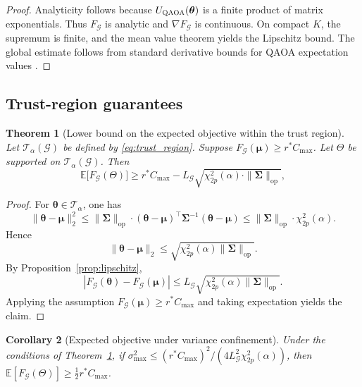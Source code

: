 \documentclass[aps,prx,reprint,superscriptaddress,longbibliography]{revtex4-2}
\newcommand{\QAOA}{\textnormal{\textsc{QAOA}}}
\newcommand{\calG}{\mathcal{G}}
\newcommand{\calT}{\mathcal{T}}
\newcommand{\bbE}{\mathbb{E}}
\newtheorem{theorem}{Theorem}
\newtheorem{corollary}[theorem]{Corollary}
\begin{document}
\begin{proof}
Analyticity follows because $U_{\QAOA}(\bm\theta)$ is a finite product
of matrix exponentials. Thus $F_\calG$ is analytic and $\nabla F_\calG$
is continuous. On compact $K$, the supremum is finite, and the mean
value theorem yields the Lipschitz bound. The global estimate follows
from standard derivative bounds for \QAOA{} expectation values
\cite{cerezo2021,schuld2019}.
\end{proof}

\subsection{Trust-region guarantees}

\begin{theorem}[Lower bound on the expected objective within the trust region]
\label{thm:landscape_lb}
Let $\calT_\alpha(\calG)$ be defined by \cref{eq:trust_region}. Suppose
$F_\calG(\bm\mu) \ge r^* C_{\max}$. Let $\Theta$ be supported on
$\calT_\alpha(\calG)$. Then
\begin{equation}
    \bbE\bigl[F_\calG(\Theta)\bigr]
    \ge r^* C_{\max}
    - L_\calG \sqrt{\chi^2_{2p}(\alpha)\cdot
    \|\bm\Sigma\|_{\mathrm{op}}},
    \label{eq:landscape_lb}
\end{equation}
\end{theorem}
\begin{proof}
For $\bm\theta \in \calT_\alpha$, one has
\begin{equation*}
    \|\bm\theta - \bm\mu\|_2^2
    \le \|\bm\Sigma\|_{\mathrm{op}}\cdot
    (\bm\theta - \bm\mu)^\top \bm\Sigma^{-1}(\bm\theta - \bm\mu)
    \le \|\bm\Sigma\|_{\mathrm{op}}\cdot \chi^2_{2p}(\alpha).
\end{equation*}
Hence
\begin{equation*}
    \|\bm\theta - \bm\mu\|_2
    \le \sqrt{\chi^2_{2p}(\alpha)\|\bm\Sigma\|_{\mathrm{op}}}.
\end{equation*}
By Proposition~\ref{prop:lipschitz},
\begin{equation*}
    |F_\calG(\bm\theta) - F_\calG(\bm\mu)|
    \le L_\calG \sqrt{\chi^2_{2p}(\alpha)\|\bm\Sigma\|_{\mathrm{op}}}.
\end{equation*}
Applying the assumption $F_\calG(\bm\mu) \ge r^* C_{\max}$ and taking
expectation yields the claim.
\end{proof}

\begin{corollary}[Expected objective under variance confinement]
\label{cor:quality_confinement}
Under the conditions of Theorem~\ref{thm:landscape_lb}, if
$\sigma_{\max}^2 \le (r^* C_{\max})^2 /
(4 L_\calG^2 \chi^2_{2p}(\alpha))$, then
$\bbE[F_\calG(\Theta)] \ge \tfrac{1}{2} r^* C_{\max}$.
\end{corollary}
\end{document}
